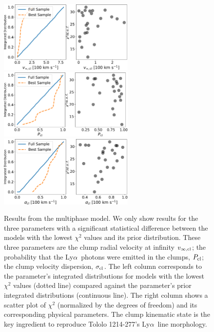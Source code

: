 \documentclass[a4,useAMS,usenatbib,usegraphicx]{mn2e}
\newcommand{\tol}{Tololo 1214-277}
\newcommand{\lya}{Ly$\alpha$}
\begin{document}
\begin{figure}
\begin{center}
  \includegraphics[width=0.6\textwidth]{vinf_cl.pdf}
  \includegraphics[width=0.6\textwidth]{P_cl.pdf}
  \includegraphics[width=0.6\textwidth]{sigma_cl.pdf}
\caption{Results from the multiphase  model.
  We only show results for the three parameters with a significant
  statistical difference between the models with the lowest $\chi^2$
  values and its prior distribution. 
  These three parameters are the clump radial velocity at infinity 
  $v_{\infty, \rm{cl}}$; the probability that  the \lya\ photons were
  emitted in the clumps, $P_{\rm cl}$; the clump velocity dispersion,
  $\sigma_{\rm cl}$.
  The left column corresponds to the parameter's integrated distributions for
  models with the lowest $\chi^2$ values (dotted line) compared against the
  parameter's prior integrated distributions (continuous line).
  The right column shows a scatter plot of $\chi^2$ (normalized by the
  degrees of freedom) and its corresponding physical parameters.
  The clump kinematic state is the key ingredient to
  reproduce \tol's \lya\ line morphology.
  \label{multiphaseresults}
}  
\end{center}
\end{figure}
\end{document}
